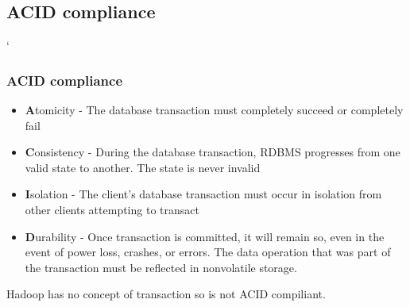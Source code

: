 \documentclass{beamer}
\begin{document}
\subsection{ACID compliance}
\begin{frame}
`\frametitle{ACID compliance}
\begin{itemize}
  \item {\color{mycolordef}\textbf{A}}tomicity - The database transaction must completely succeed or completely fail
  \item {\color{mycolordef}\textbf{C}}onsistency - During the database transaction, RDBMS progresses from one valid state to another. The state is never invalid
  \item {\color{mycolordef}\textbf{I}}solation - The client's database transaction must occur in isolation from other clients attempting to transact
  \item {\color{mycolordef}\textbf{D}}urability - Once transaction is committed, it will remain so, 
    even in the event of power loss, crashes, or errors. The data operation that was part of the transaction must be reflected in nonvolatile storage. 
\end{itemize}

Hadoop has no concept of transaction so is not ACID compiliant.

\end{frame}
\end{document}
